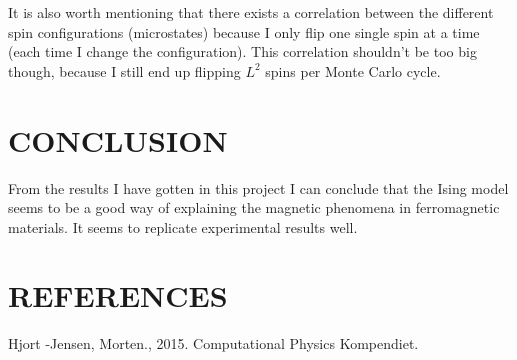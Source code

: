 \documentclass[twocolumn]{article}
\begin{document}
It is also worth mentioning that there exists a correlation between the different spin configurations (microstates) because I only flip one single spin at a time (each time I change the configuration). This correlation shouldn't be too big though, because I still end up flipping $L^2$ spins per Monte Carlo cycle.\newline

\section{CONCLUSION}
From the results I have gotten in this project I can conclude that the Ising model seems to be a good way of explaining the magnetic phenomena in ferromagnetic materials. It seems to replicate experimental results well. 

\section{REFERENCES}
Hjort -Jensen, Morten., 2015. Computational Physics Kompendiet.
\end{document}
